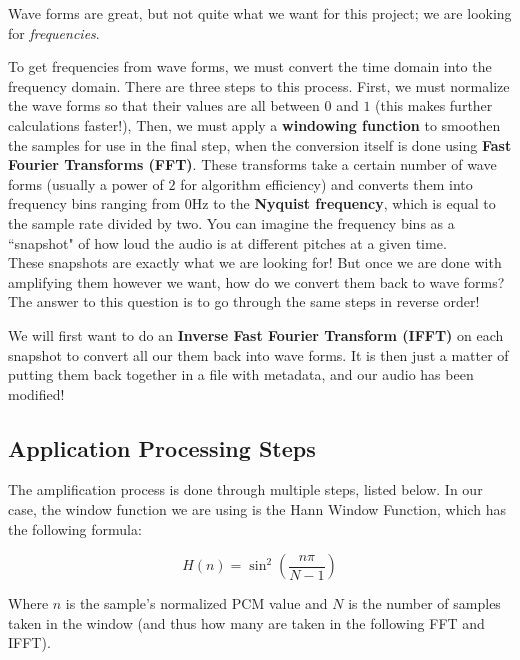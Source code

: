 \documentclass[11pt]{extarticle}
\begin{document}
Wave forms are great, but not quite what we want for this project; we are looking for \textit{frequencies}.

To get frequencies from wave forms, we must convert the time domain into the frequency domain. There are three steps to this process. First, we must normalize the wave forms so that their values are all between $0$ and $1$ (this makes further calculations faster!), Then, we must apply a \textbf{windowing function} to smoothen the samples for use in the final step, when the conversion itself is done using \textbf{Fast Fourier Transforms (FFT)}. These transforms take a certain number of wave forms (usually a power of $2$ for algorithm efficiency) and converts them into frequency bins ranging from $0$Hz to the \textbf{Nyquist frequency}, which is equal to the sample rate divided by two. You can imagine the frequency bins as a ``snapshot" of how loud the audio is at different pitches at a given time.\\

These snapshots are exactly what we are looking for! But once we are done with amplifying them however we want, how do we convert them back to wave forms? The answer to this question is to go through the same steps in reverse order!

We will first want to do an \textbf{Inverse Fast Fourier Transform (IFFT)} on each snapshot to convert all our them back into wave forms. It is then just a matter of putting them back together in a file with metadata, and our audio has been modified!

\subsection{Application Processing Steps}\label{steps}

The amplification process is done through multiple steps, listed below. In our case, the window function we are using is the Hann Window Function, which has the following formula:

$$H(n) = \sin^2\left(\frac{n\pi}{N-1}\right)$$

Where $n$ is the sample's normalized PCM value and $N$ is the number of samples taken in the window (and thus how many are taken in the following FFT and IFFT).
\end{document}
